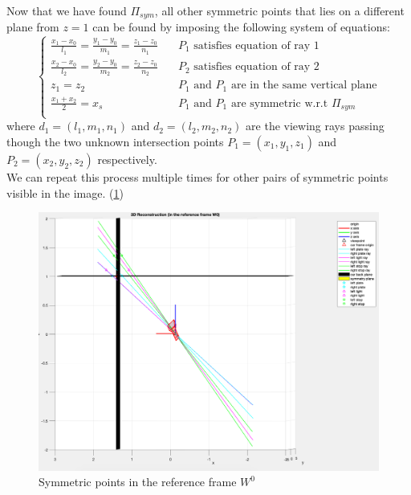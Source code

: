 \documentclass{article}
\begin{document}
\newpage
Now that we have found $\Pi_{sym}$, all other symmetric points that lies on a different plane from $z=1$ can be found by imposing the following system of equations:
$$ \begin{cases}
\frac{x_1-x_0}{l_1} = \frac{y_1-y_0}{m_1} = \frac{z_1-z_0}{n_1} & \quad P_1 \text{ satisfies equation of ray 1} \\
\frac{x_2-x_0}{l_2} = \frac{y_2-y_0}{m_2} = \frac{z_2-z_0}{n_2} & \quad P_2 \text{ satisfies equation of ray 2} \\
z_1 = z_2 & \quad P_1 \text{ and } P_1 \text{ are in the same vertical plane} \\
\frac{x_1 + x_2}{2} = x_s & \quad P_1 \text{ and } P_1 \text{ are symmetric w.r.t } \Pi_{sym} \\
\end{cases} $$
where $d_1 = (l_1, m_1, n_1)$ and $d_2 = (l_2, m_2, n_2)$ are the viewing rays
passing though the two unknown intersection points $P_1 = (x_1, y_1, z_1)$ and $P_2 = (x_2, y_2, z_2)$ respectively.
\\
We can repeat this process multiple times for other pairs of symmetric points visible in the image. (\ref{fig:3dreconstructionW0})
\begin{figure}[hbt!]
\centering
\includegraphics[scale=0.4]{images/3DreconstructionW0.png}
\caption{Symmetric points in the reference frame $W^0$}
\label{fig:3dreconstructionW0}
\end{figure}
\\
\end{document}
